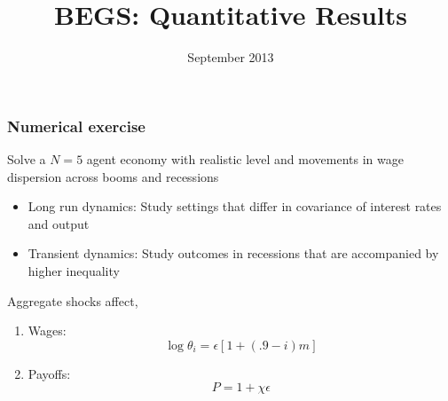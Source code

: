 \documentclass{beamer}
\title {BEGS: Quantitative Results}
\date{September 2013}
\begin{document}
%
\begin{frame}
\titlepage

\end{frame}


\begin{frame}
\frametitle{Numerical exercise}
 
Solve a $N=5$ agent economy with realistic level and movements in wage dispersion across booms and recessions

\begin{itemize}
 \item Long run dynamics: Study settings that differ in covariance of interest rates and output
 \item Transient dynamics: Study outcomes in recessions that are accompanied by higher inequality
\end{itemize}

Aggregate shocks affect,
\begin{enumerate}
\item Wages: \[\log \theta_i=\epsilon [1+(.9-i)m]\]
 \item Payoffs: \[P=1+\chi \epsilon \]
\end{enumerate}

\end{frame}
\end{document}
